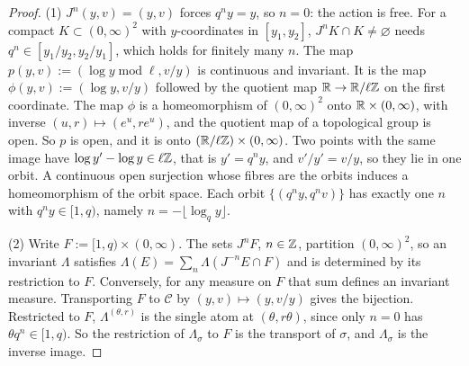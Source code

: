\begin{proof}
\leanok
{}
(1) $J^n(y,v) = (y,v)$ forces $q^ny = y$, so $n = 0$: the action is free. For a compact
$K \subset (0,\infty)^2$ with $y$-coordinates in $[y_1, y_2]$, $J^nK \cap K \ne \varnothing$ needs
$q^n \in [y_1/y_2, y_2/y_1]$, which holds for finitely many $n$. The map
$p(y,v) := (\log y \operatorname{mod} \ell, v/y)$ is continuous and invariant. It is the map
$\phi(y,v) := (\log y, v/y)$ followed by the quotient map $\mathbb{R} \to \mathbb{R}/\ell\mathbb{Z}$ on the first
coordinate. The map $\phi$ is a homeomorphism of $(0,\infty)^2$ onto $\mathbb{R} \times (0,\infty)$, with
inverse $(u, r) \mapsto (e^u, re^u)$, and the quotient map of a topological group is open. So $p$
is open, and it is onto $(\mathbb{R}/\ell\mathbb{Z}) \times (0,\infty)$. Two points with the same image have
$\log y' - \log y \in \ell\mathbb{Z}$, that is $y' = q^ny$, and $v'/y' = v/y$, so they lie in one orbit.
A continuous open surjection whose fibres are the orbits induces a homeomorphism of the orbit space.
Each orbit $\{(q^ny, q^nv)\}$ has exactly one $n$ with $q^ny \in [1,q)$, namely
$n = -\lfloor\log_qy\rfloor$.

(2) Write $F := [1,q) \times (0,\infty)$. The sets $J^nF$, $n \in \mathbb{Z}$, partition $(0,\infty)^2$, so
an invariant $\Lambda$ satisfies $\Lambda(E) = \sum_n\Lambda(J^{-n}E \cap F)$ and is determined by
its restriction to $F$. Conversely, for any measure on $F$ that sum defines an invariant measure.
Transporting $F$ to $\mathcal{C}$ by $(y,v) \mapsto (y, v/y)$ gives the bijection. Restricted to $F$,
$\Lambda^{(\theta,r)}$ is the single atom at $(\theta, r\theta)$, since only $n = 0$ has
$\theta q^n \in [1,q)$. So the restriction of $\Lambda_\sigma$ to $F$ is the transport of $\sigma$,
and $\Lambda_\sigma$ is the inverse image.


\end{proof}
